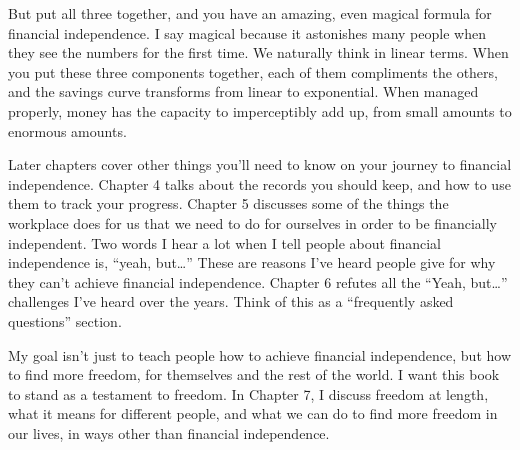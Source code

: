 But put all three together, and you have an amazing, even magical formula for financial independence. I say magical because it astonishes many people when they see the numbers for the first time. We naturally think in linear terms. When you put these three components together, each of them compliments the others, and the savings curve transforms from linear to exponential. When managed properly, money has the capacity to imperceptibly add up, from small amounts to enormous amounts.

Later chapters cover other things you'll need to know on your journey to financial independence. Chapter 4 talks about the records you should keep, and how to use them to track your progress. Chapter 5 discusses some of the things the workplace does for us that we need to do for ourselves in order to be financially independent. Two words I hear a lot when I tell people about financial independence is, ``yeah, but\ldots'' These are reasons I've heard people give for why they can't achieve financial independence. Chapter 6 refutes all the ``Yeah, but\ldots'' challenges I've heard over the years. Think of this as a “frequently asked questions” section.

My goal isn't just to teach people how to achieve financial independence, but how to find more freedom, for themselves and the rest of the world. I want this book to stand as a testament to freedom. In Chapter 7, I discuss freedom at length, what it means for different people, and what we can do to find more freedom in our lives, in ways other than financial independence.

\newpage
